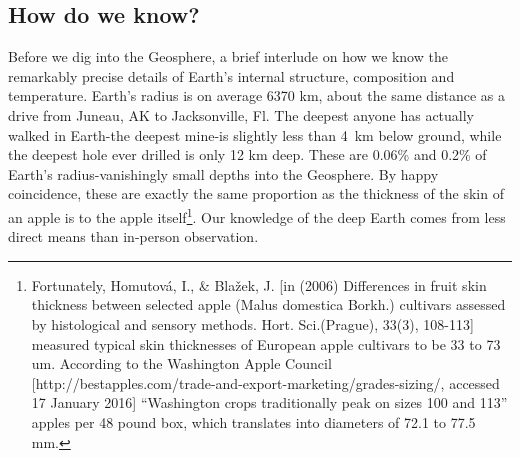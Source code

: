 \documentclass[amstex,12pt]{book}
\begin{document}
\subsection{How do we know?}
Before we dig into the Geosphere, a brief interlude on how we know the remarkably precise details of Earth's internal structure, composition and temperature. Earth's radius is on average 6370 km, about the same distance as a drive from Juneau, AK to Jacksonville, Fl. The deepest anyone has actually walked in Earth-the deepest mine-is slightly less than \SI{4}{\kilo\metre} below ground, while the deepest hole ever drilled is only 12 km deep. These are 0.06\% and 0.2\% of Earth's radius-vanishingly small depths into the Geosphere. By happy coincidence, these are exactly the same proportion as the thickness of the skin of an apple is to the apple itself\footnote{Fortunately, Homutov\'{a}, I., \& Bla\v{z}ek, J. [in (2006) Differences in fruit skin thickness between selected apple (Malus domestica Borkh.) cultivars assessed by histological and sensory methods. Hort. Sci.(Prague), 33(3), 108-113] measured typical skin thicknesses of European apple cultivars to be 33 to 73 um. According to the Washington Apple Council [http://bestapples.com/trade-and-export-marketing/grades-sizing/, accessed 17 January 2016] ``Washington crops traditionally peak on sizes 100 and 113'' apples per 48 pound box, which translates into diameters of 72.1 to 77.5 mm.}. Our knowledge of the deep Earth comes from less direct means than in-person observation.\\
\end{document}
